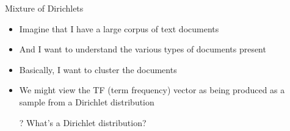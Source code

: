 \documentclass[aspectratio=169]{beamer}
\begin{document}
\begin{frame}{Mixture of Dirichlets}

\begin{itemize}
\item Imagine that I have a large corpus of text documents
\item And I want to understand the various types of documents present
\item Basically, I want to cluster the documents
\item We might view the TF (term frequency) vector as being produced as a sample from a Dirichlet distribution
\item[?] What's a Dirichlet distribution?
\end{itemize}
\end{frame}
%
\end{document}
